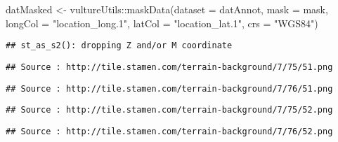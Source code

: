 \documentclass[
]{article}
\newenvironment{Shaded}{\begin{snugshade}}{\end{snugshade}}
\newcommand{\AttributeTok}[1]{\textcolor[rgb]{0.77,0.63,0.00}{#1}}
\newcommand{\CommentTok}[1]{\textcolor[rgb]{0.56,0.35,0.01}{\textit{#1}}}
\newcommand{\DecValTok}[1]{\textcolor[rgb]{0.00,0.00,0.81}{#1}}
\newcommand{\FunctionTok}[1]{\textcolor[rgb]{0.00,0.00,0.00}{#1}}
\newcommand{\NormalTok}[1]{#1}
\newcommand{\OtherTok}[1]{\textcolor[rgb]{0.56,0.35,0.01}{#1}}
\newcommand{\SpecialCharTok}[1]{\textcolor[rgb]{0.00,0.00,0.00}{#1}}
\newcommand{\StringTok}[1]{\textcolor[rgb]{0.31,0.60,0.02}{#1}}
\begin{document}
\begin{Shaded}
\begin{Highlighting}[]
\NormalTok{datMasked }\OtherTok{\textless{}{-}}\NormalTok{ vultureUtils}\SpecialCharTok{::}\FunctionTok{maskData}\NormalTok{(}\AttributeTok{dataset =}\NormalTok{ datAnnot, }\AttributeTok{mask =}\NormalTok{ mask, }\AttributeTok{longCol =} \StringTok{"location\_long.1"}\NormalTok{, }\AttributeTok{latCol =} \StringTok{"location\_lat.1"}\NormalTok{, }\AttributeTok{crs =} \StringTok{"WGS84"}\NormalTok{)}
\end{Highlighting}
\end{Shaded}

\begin{verbatim}
## st_as_s2(): dropping Z and/or M coordinate
\end{verbatim}

\begin{Shaded}
\end{Shaded}

\begin{verbatim}
## Source : http://tile.stamen.com/terrain-background/7/75/51.png
\end{verbatim}

\begin{verbatim}
## Source : http://tile.stamen.com/terrain-background/7/76/51.png
\end{verbatim}

\begin{verbatim}
## Source : http://tile.stamen.com/terrain-background/7/75/52.png
\end{verbatim}

\begin{verbatim}
## Source : http://tile.stamen.com/terrain-background/7/76/52.png
\end{verbatim}
\end{document}
